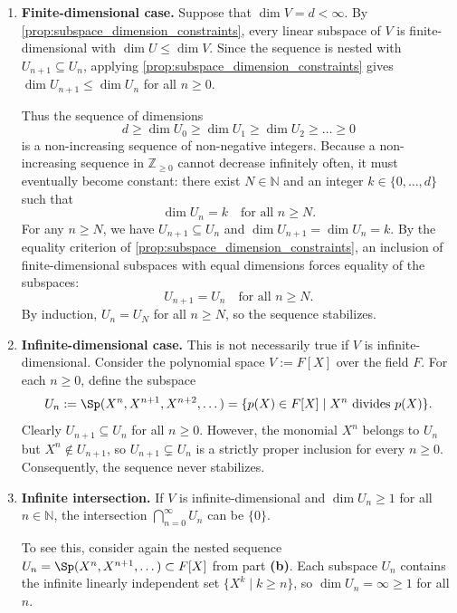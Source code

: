 \begin{exercisesolution}
\label{sol:descending_chains_subspaces}
\begin{enumerate}[label=\textbf{(\alph*)}]
    \item \textbf{Finite-di\-men\-sional case.} Suppose that $\dim V = d < \infty$. By \cref{prop:subspace_dimension_constraints}, every linear subspace of $V$ is finite-di\-men\-sional with $\dim U \le \dim V$. Since the sequence is nested with $U_{n+1} \subseteq U_n$, applying \cref{prop:subspace_dimension_constraints} gives $\dim U_{n+1} \le \dim U_n$ for all $n \ge 0$.
    
    Thus the sequence of dimensions
    \[
        d \ge \dim U_0 \ge \dim U_1 \ge \dim U_2 \ge \dots \ge 0
    \]
    is a non-increasing sequence of non-negative integers. Because a non-increasing sequence in $\mathbb{Z}_{\ge 0}$ cannot decrease infinitely often, it must eventually become constant: there exist $N \in \mathbb{N}$ and an integer $k \in \{0, \dots, d\}$ such that
    \[
        \dim U_n = k \quad \text{for all } n \ge N.
    \]
    For any $n \ge N$, we have $U_{n+1} \subseteq U_n$ and $\dim U_{n+1} = \dim U_n = k$. By the equality criterion of \cref{prop:subspace_dimension_constraints}, an inclusion of finite-di\-men\-sional subspaces with equal dimensions forces equality of the subspaces:
    \[
        U_{n+1} = U_n \quad \text{for all } n \ge N.
    \]
    By induction, $U_n = U_N$ for all $n \ge N$, so the sequence stabilizes.

    \item \textbf{Infinite-di\-men\-sional case.} This is not necessarily true if $V$ is infinite-di\-men\-sional. Consider the polynomial space $V := F[X]$ over the field $F$. For each $n \ge 0$, define the subspace
    \[
        U_n := \Sp(X^n, X^{n+1}, X^{n+2}, \dots) = \{p(X) \in F[X] \mid X^n \text{ divides } p(X)\}.
    \]
    Clearly $U_{n+1} \subseteq U_n$ for all $n \ge 0$. However, the monomial $X^n$ belongs to $U_n$ but $X^n \notin U_{n+1}$, so $U_{n+1} \subsetneq U_n$ is a strictly proper inclusion for every $n \ge 0$. Consequently, the sequence never stabilizes.

    \item \textbf{Infinite intersection.} If $V$ is infinite-di\-men\-sional and $\dim U_n \ge 1$ for all $n \in \mathbb{N}$, the intersection $\bigcap_{n=0}^\infty U_n$ can be $\{0\}$.
    
    To see this, consider again the nested sequence $U_n = \Sp(X^n, X^{n+1}, \dots) \subset F[X]$ from part \textbf{(b)}. Each subspace $U_n$ contains the infinite linearly independent set $\{X^k \mid k \ge n\}$, so $\dim U_n = \infty \ge 1$ for all $n$.
    

\end{enumerate}
\end{exercisesolution}
